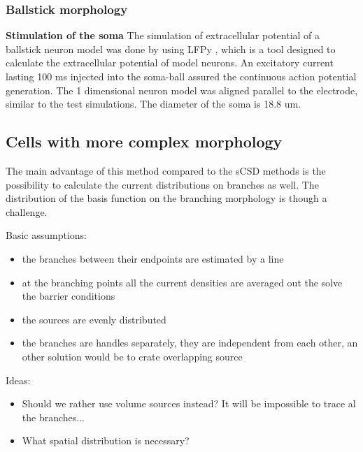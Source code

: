 \documentclass[12pt,a4paper]{article}
\begin{document}
\subsubsection{Ballstick morphology}


\textbf{Stimulation of the soma}
The simulation of extracellular potential of a ballstick neuron model was done by using LFPy \cite{LFPy}, which is a tool designed to calculate the extracellular potential of model neurons. An excitatory current lasting 100 ms injected into the soma-ball assured the continuous action potential generation.  The 1 dimensional neuron model was aligned parallel to the electrode, similar to the test simulations. The diameter of the soma is 18.8 um. 



\subsection{Cells with more complex morphology}
The main advantage of this method compared to the sCSD methods is the possibility to calculate the current distributions on branches as well. The distribution of the basis function on the branching morphology is though a challenge.

Basic assumptions:
\begin{itemize}
\item the branches between their endpoints are estimated by a line
\item at the branching points all the current densities are averaged out the solve the barrier conditions
\item the sources are evenly distributed
\item the branches are handles separately, they are independent from each other, an other solution would be to crate overlapping source 
\end{itemize}

Ideas:
\begin{itemize}
\item Should we rather use volume sources instead? It will be impossible to trace al the branches...
\item What spatial distribution is necessary? 
\end{itemize}

\end{document}
